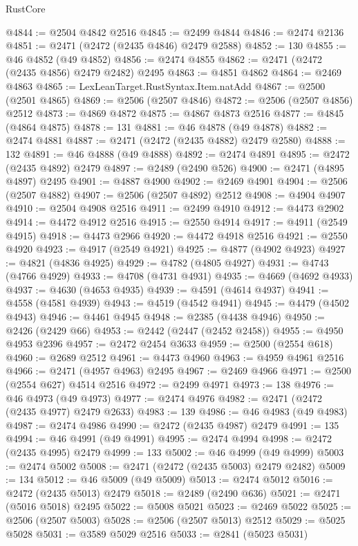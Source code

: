 \begin{lexlean}{RustCore}
\begin{coremodule}
@4844 := @2504 @4842 @2516
@4845 := @2499 @4844
@4846 := @2474 @2136
@4851 := @2471 (@2472 (@2435 @4846) @2479 @2588)
@4852 := 130
@4855 := @46 @4852 (@49 @4852)
@4856 := @2474 @4855
@4862 := @2471 (@2472 (@2435 @4856) @2479 @2482) @2495
@4863 := @4851 @4862
@4864 := @2469 @4863
@4865 := LexLeanTarget.RustSyntax.Item.natAdd
@4867 := @2500 (@2501 @4865)
@4869 := @2506 (@2507 @4846)
@4872 := @2506 (@2507 @4856) @2512
@4873 := @4869 @4872
@4875 := @4867 @4873 @2516
@4877 := @4845 (@4864 @4875)
@4878 := 131
@4881 := @46 @4878 (@49 @4878)
@4882 := @2474 @4881
@4887 := @2471 (@2472 (@2435 @4882) @2479 @2580)
@4888 := 132
@4891 := @46 @4888 (@49 @4888)
@4892 := @2474 @4891
@4895 := @2472 (@2435 @4892) @2479
@4897 := @2489 (@2490 @526)
@4900 := @2471 (@4895 @4897) @2495
@4901 := @4887 @4900
@4902 := @2469 @4901
@4904 := @2506 (@2507 @4882)
@4907 := @2506 (@2507 @4892) @2512
@4908 := @4904 @4907
@4910 := @2504 @4908 @2516
@4911 := @2499 @4910
@4912 := @4473 @2902
@4914 := @4472 @4912 @2516
@4915 := @2550 @4914
@4917 := @4911 (@2549 @4915)
@4918 := @4473 @2966
@4920 := @4472 @4918 @2516
@4921 := @2550 @4920
@4923 := @4917 (@2549 @4921)
@4925 := @4877 (@4902 @4923)
@4927 := @4821 (@4836 @4925)
@4929 := @4782 (@4805 @4927)
@4931 := @4743 (@4766 @4929)
@4933 := @4708 (@4731 @4931)
@4935 := @4669 (@4692 @4933)
@4937 := @4630 (@4653 @4935)
@4939 := @4591 (@4614 @4937)
@4941 := @4558 (@4581 @4939)
@4943 := @4519 (@4542 @4941)
@4945 := @4479 (@4502 @4943)
@4946 := @4461 @4945
@4948 := @2385 (@4438 @4946)
@4950 := @2426 (@2429 @66)
@4953 := @2442 (@2447 (@2452 @2458))
@4955 := @4950 @4953 @2396
@4957 := @2472 @2454 @3633
@4959 := @2500 (@2554 @618)
@4960 := @2689 @2512
@4961 := @4473 @4960
@4963 := @4959 @4961 @2516
@4966 := @2471 (@4957 @4963) @2495
@4967 := @2469 @4966
@4971 := @2500 (@2554 @627) @4514 @2516
@4972 := @2499 @4971
@4973 := 138
@4976 := @46 @4973 (@49 @4973)
@4977 := @2474 @4976
@4982 := @2471 (@2472 (@2435 @4977) @2479 @2633)
@4983 := 139
@4986 := @46 @4983 (@49 @4983)
@4987 := @2474 @4986
@4990 := @2472 (@2435 @4987) @2479
@4991 := 135
@4994 := @46 @4991 (@49 @4991)
@4995 := @2474 @4994
@4998 := @2472 (@2435 @4995) @2479
@4999 := 133
@5002 := @46 @4999 (@49 @4999)
@5003 := @2474 @5002
@5008 := @2471 (@2472 (@2435 @5003) @2479 @2482)
@5009 := 134
@5012 := @46 @5009 (@49 @5009)
@5013 := @2474 @5012
@5016 := @2472 (@2435 @5013) @2479
@5018 := @2489 (@2490 @636)
@5021 := @2471 (@5016 @5018) @2495
@5022 := @5008 @5021
@5023 := @2469 @5022
@5025 := @2506 (@2507 @5003)
@5028 := @2506 (@2507 @5013) @2512
@5029 := @5025 @5028
@5031 := @3589 @5029 @2516
@5033 := @2841 (@5023 @5031)

\end{coremodule}
\end{lexlean}
